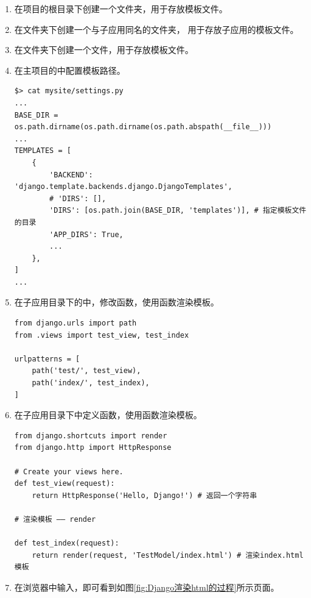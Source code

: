\begin{enumerate}[label=\arabic*)]
    \item 在项目的根目录下创建一个文件夹，用于存放模板文件。
    \item 在文件夹下创建一个与子应用同名的文件夹，
    用于存放子应用的模板文件。

    \item 在文件夹下创建一个文件，用于存放模板文件。
    \item 在主项目的中配置模板路径。
\begin{lstlisting}[style=demostyle, numbers=none]    
$> cat mysite/settings.py
...
BASE_DIR = os.path.dirname(os.path.dirname(os.path.abspath(__file__)))
...
TEMPLATES = [
    {
        'BACKEND': 'django.template.backends.django.DjangoTemplates',
        # 'DIRS': [],
        'DIRS': [os.path.join(BASE_DIR, 'templates')], # 指定模板文件的目录
        'APP_DIRS': True,
        ...
    },
]
...
\end{lstlisting}    
    \item 在子应用目录下的中，修改函数，使用函数渲染模板。
\begin{lstlisting}[style=demostyle, numbers=none]
from django.urls import path
from .views import test_view, test_index

urlpatterns = [
    path('test/', test_view),
    path('index/', test_index),
]
\end{lstlisting}    
    \item 在子应用目录下中定义函数，使用函数渲染模板。
\begin{lstlisting}[style=demostyle, numbers=none]
from django.shortcuts import render
from django.http import HttpResponse

# Create your views here.
def test_view(request):
    return HttpResponse('Hello, Django!') # 返回一个字符串

# 渲染模板 —— render

def test_index(request):
    return render(request, 'TestModel/index.html') # 渲染index.html模板
\end{lstlisting}    
    \item 在浏览器中输入，即可看到如图\ref{fig:Django渲染html的过程}所示页面。    
\end{enumerate}


